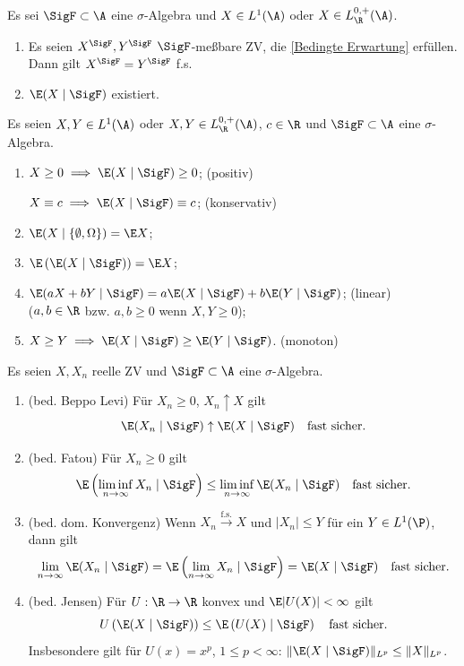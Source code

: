\documentclass[11pt, a4paper]{article}
\begin{document}
\begin{theorem}
    Es sei $\SigF \subset \A$ eine $\sigma$-Algebra und $X \in L^1(\A)$ oder $X \in L^{0,+}_{\R}(\A)$.
    \begin{enumerate}[label=\alph*)]
        \item Es seien $X^{\SigF}, Y^{\SigF}$ $\SigF$-meßbare ZV, die \ref{Bedingte Erwartung} erfüllen. \newline Dann gilt $X^{\SigF} = Y^{\SigF}$ f.s.
        \item $\E(X \mid \SigF)$ existiert.
    \end{enumerate}
\end{theorem}

\begin{lemma}
    Es seien $X, Y \in L^1(\A)$ oder $X, Y \in L^{0,+}_{\R}(\A)$, $c \in \R$ und $\SigF \subset \A$ eine $\sigma$-Algebra.
    \begin{enumerate}[label=\alph*)]
        \item $X \ge 0 \implies \E(X \mid \SigF) \ge 0$; \hfill (positiv) \par
        $X \equiv c \implies \E(X \mid \SigF) \equiv c$; \hfill (konservativ)
        \item $\E(X \mid \{\emptyset, \Omega\}) = \E X$;
        \item $\E\left(\E(X \mid \SigF)\right) = \E X$;
        \item $\E(aX + bY \mid \SigF) = a\E(X \mid \SigF) + b\E(Y \mid \SigF)$; \hfill (linear) \\
        ($a, b \in \R$ bzw. $a, b \ge 0$ wenn $X, Y \ge 0$);
        \item $X \ge Y \implies \E(X \mid \SigF) \ge \E(Y \mid \SigF)$. \hfill (monoton)
    \end{enumerate}
\end{lemma}


\begin{theorem}[Konvergenzsätze]
    Es seien $X, X_n$ reelle ZV und $\SigF \subset \A$ eine $\sigma$-Algebra.
    \begin{enumerate}[label=\alph*)]
        \item (bed. Beppo Levi) Für $X_n \ge 0$, $X_n \uparrow X$ gilt
        $$\E(X_n \mid \SigF) \uparrow \E(X \mid \SigF) \quad \text{fast sicher}.$$
        \item (bed. Fatou) Für $X_n \ge 0$ gilt
        $$\E\left(\liminf_{n \to \infty} X_n \mid \SigF\right) \le \liminf_{n \to \infty} \E(X_n \mid \SigF) \quad \text{fast sicher}.$$
        \item (bed. dom. Konvergenz) Wenn $X_n \xrightarrow{\text{f.s.}} X$ und $|X_n| \le Y$ für ein $Y \in L^1(\P)$, dann gilt
        $$\lim_{n \to \infty} \E(X_n \mid \SigF) = \E\left(\lim_{n \to \infty} X_n \mid \SigF\right) = \E(X \mid \SigF) \quad \text{fast sicher}.$$
        \item (bed. Jensen) Für $U: \R \to \R$ konvex und $\E|U(X)| < \infty$ gilt
        $$U\left(\E(X \mid \SigF)\right) \le \E\left(U(X) \mid \SigF\right) \quad \text{fast sicher}.$$
        Insbesondere gilt für $U(x) = x^p$, $1 \le p < \infty$: $\|\E(X \mid \SigF)\|_{L^p} \le \|X\|_{L^p}$.
    \end{enumerate}
\end{theorem}
\end{document}
